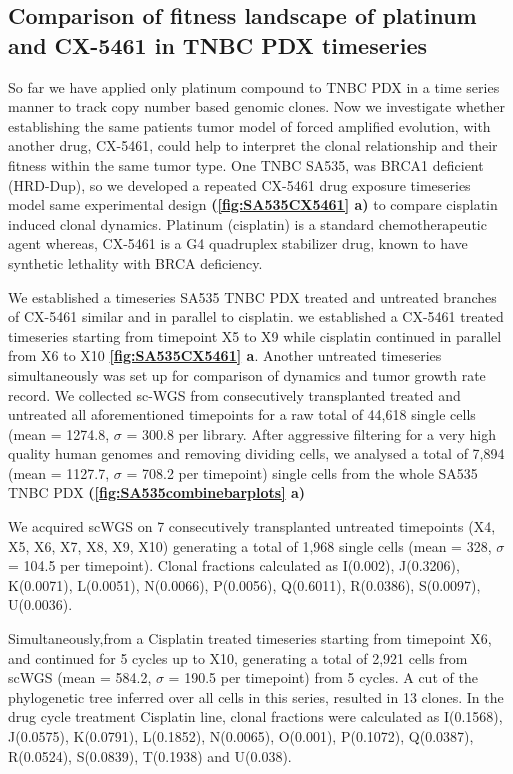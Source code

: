 

\subsection{Comparison of fitness landscape of platinum and CX-5461 in TNBC PDX timeseries}
So far we have applied only platinum compound to TNBC PDX in a time series manner to track copy number based genomic clones. Now we investigate whether establishing the same patients tumor model of forced amplified evolution, with another drug, CX-5461, could help to interpret the clonal relationship and their fitness within the same tumor type.
One TNBC SA535, was BRCA1 deficient (HRD-Dup), so we developed a repeated CX-5461 drug exposure timeseries model same experimental design \textbf{(\autoref{fig:SA535CX5461} a)} to compare cisplatin induced clonal dynamics. Platinum (cisplatin) is a standard chemotherapeutic agent whereas, CX-5461 is a G4 quadruplex stabilizer drug, known to have synthetic lethality with BRCA deficiency.

We established a timeseries SA535 TNBC PDX treated and untreated branches of CX-5461 similar and in parallel to cisplatin.
we established a CX-5461 treated timeseries starting from timepoint X5 to X9 while cisplatin continued in parallel from X6 to X10  \textbf{\autoref{fig:SA535CX5461} a}. Another untreated timeseries simultaneously was set up for comparison of dynamics and tumor growth rate record.
We collected sc-WGS from consecutively transplanted treated and untreated all aforementioned timepoints for a raw total of 44,618 single cells (mean = 1274.8, $\sigma$ = 300.8 per library. After aggressive filtering for a very high quality human genomes and removing dividing cells, we analysed a total of 7,894 (mean = 1127.7, $\sigma$ = 708.2 per timepoint) single cells from the whole SA535 TNBC PDX \textbf{(\autoref{fig:SA535combinebarplots} a)}

We acquired scWGS on 7 consecutively transplanted untreated timepoints (X4, X5, X6, X7, X8, X9, X10) generating a total of 1,968 single cells (mean = 328, $\sigma$ = 104.5 per timepoint).
Clonal fractions calculated as I(0.002), J(0.3206), K(0.0071), L(0.0051), N(0.0066), P(0.0056), Q(0.6011), R(0.0386), S(0.0097), U(0.0036). 

Simultaneously,from a Cisplatin treated timeseries starting from timepoint X6, and continued for 5 cycles up to X10, generating a total of 2,921 cells from scWGS (mean = 584.2, $\sigma$ = 190.5 per timepoint) from 5 cycles. A cut of the phylogenetic tree inferred over all cells in this series, resulted in 13 clones.
In the drug cycle treatment Cisplatin line, clonal fractions were
calculated as I(0.1568), J(0.0575), K(0.0791), L(0.1852), N(0.0065), O(0.001), P(0.1072), Q(0.0387), R(0.0524), S(0.0839), T(0.1938) and U(0.038).

